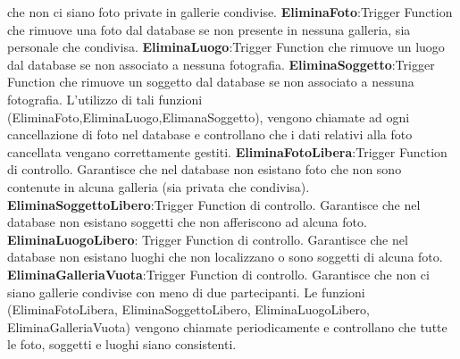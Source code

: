 che non ci siano foto private in gallerie condivise.
\newline
\newline
\newline
\textbf{EliminaFoto}:Trigger Function che rimuove una foto dal
database se non presente in nessuna galleria, sia personale che
condivisa.
\newline
\newline
\textbf{EliminaLuogo}:Trigger Function che rimuove un luogo dal
database se non associato a nessuna fotografia.
\newline
\newline
\textbf{EliminaSoggetto}:Trigger Function che rimuove un soggetto dal
database se non associato a nessuna fotografia.
\newline
L'utilizzo di tali funzioni (EliminaFoto,EliminaLuogo,ElimanaSoggetto), vengono chiamate ad ogni cancellazione di foto nel database e controllano che i dati relativi alla foto cancellata vengano
correttamente gestiti.
\newpage
\textbf{EliminaFotoLibera}:Trigger Function di controllo. Garantisce che
nel database non esistano foto che non sono contenute in
alcuna galleria (sia privata che condivisa).
\newline
\newline
\textbf{EliminaSoggettoLibero}:Trigger Function di controllo.
Garantisce che nel database non esistano soggetti che non
afferiscono ad alcuna foto.
\newline
\newline
\textbf{EliminaLuogoLibero}: Trigger Function di controllo. Garantisce
che nel database non esistano luoghi che non localizzano o
sono soggetti di alcuna foto.
\newline
\newline
\textbf{EliminaGalleriaVuota}:Trigger Function di controllo. Garantisce
che non ci siano gallerie condivise con meno di due partecipanti.
\newline
Le funzioni (EliminaFotoLibera, EliminaSoggettoLibero,
EliminaLuogoLibero, EliminaGalleriaVuota) vengono chiamate
periodicamente e controllano che tutte le foto, soggetti e
luoghi siano consistenti.